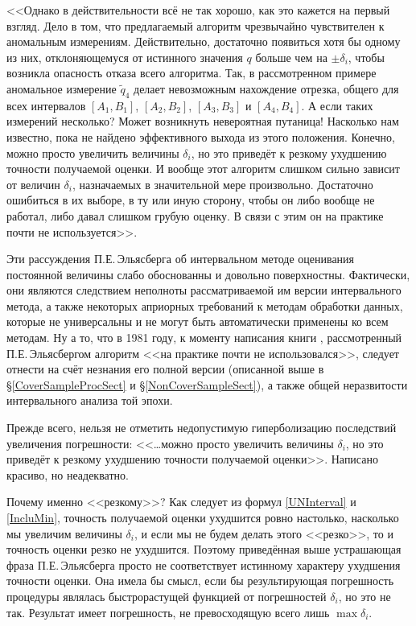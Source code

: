 \documentclass[a5paper,openany]{book}
\begin{document}
<<Однако в действительности всё не так хорошо, как это кажется на первый взгляд. Дело 
в том, что предлагаемый алгоритм чрезвычайно чувствителен к аномальным измерениям. 
Действительно, достаточно появиться хотя бы одному из них, отклоняющемуся от истинного 
значения $q$ больше чем на $\pm\delta_i$, чтобы возникла опасность отказа всего алгоритма. 
Так, в рассмотренном примере аномальное измерение $\tilde{q}_4$ делает невозможным 
нахождение отрезка, общего для всех интервалов $[A_{1}, B_{1}]$, $[A_{2}, B_{2}]$, 
$[A_{3}, B_{3}]$ и $[A_{4}, B_{4}]$. А если таких измерений несколько? Может возникнуть 
невероятная путаница! Насколько нам известно, пока не найдено эффективного выхода из этого 
положения. Конечно, можно просто увеличить величины $\delta_i$, но это приведёт к резкому 
ухудшению точности получаемой оценки. И вообще этот алгоритм слишком сильно зависит от 
величин $\delta_i$, назначаемых в значительной мере произвольно. Достаточно ошибиться 
в их выборе, в ту или иную сторону, чтобы он либо вообще не работал, либо давал слишком 
грубую оценку. В связи с этим он на практике почти не используется>>. 
  
Эти рассуждения П.Е.\,Эльясберга об интервальном методе оценивания постоянной величины 
слабо обоснованны и довольно поверхностны. Фактически, они являются следствием неполноты 
рассматриваемой им версии интервального метода, а также некоторых априорных требований 
к методам обработки данных, которые не универсальны и не могут быть автоматически 
применены ко всем методам. Ну а то, что в 1981 году, к моменту написания книги 
\cite{Eliasberg83}, рассмотренный П.Е.\,Эльясбергом алгоритм <<на практике почти 
не использовался>>, следует отнести на счёт незнания его полной версии (описанной 
выше в \S\ref{CoverSampleProcSect} и  \S\ref{NonCoverSampleSect}), а также общей 
неразвитости интервального анализа той эпохи. 
  
Прежде всего, нельзя не отметить недопустимую гиперболизацию последствий увеличения 
погрешности: <<\ldots можно просто увеличить величины $\delta_i$, но это приведёт 
к резкому ухудшению точности получаемой оценки>>. Написано красиво, но неадекватно. 
  
Почему именно <<резкому>>? Как следует из формул \eqref{UNInterval} и \eqref{IncluMin},  
точность получаемой оценки ухудшится ровно настолько, насколько мы увеличим величины 
$\delta_i$, и если мы не будем делать этого <<резко>>, то и точность оценки резко 
не ухудшится. Поэтому приведённая выше устрашающая фраза П.Е.\,Эльясберга просто 
не соответствует истинному характеру ухудшения точности оценки. Она имела бы смысл, 
если бы результирующая погрешность процедуры являлась быстрорастущей функцией от 
погрешностей $\delta_i$, но это не так. Результат имеет погрешность, не превосходящую 
всего лишь $\max \delta_{i}$. 
   
\end{document}
